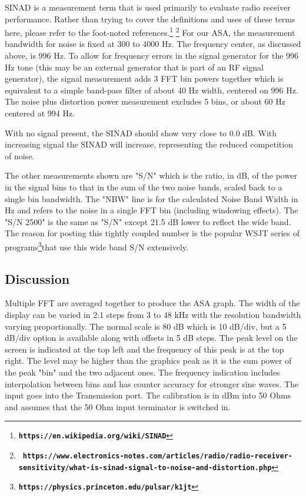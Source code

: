 SINAD is a measurement term that is used primarily to evaluate radio receiver performance.  Rather than trying to cover the definitions and uses of these terms here, please refer to the foot-noted references.\footnote{\textbf{\texttt{https://en.wikipedia.org/wiki/SINAD}}} \footnote{{\tiny\ \textbf{\texttt{https://www.electronics-notes.com/articles/radio/radio-receiver-sensitivity/what-is-sinad-signal-to-noise-and-distortion.php}}}}
%
For our ASA, the measurement bandwidth for noise is fixed at 300 to 4000 Hz.  The frequency center, as discussed above, is 996 Hz.  To allow for frequency errors in the signal generator for the 996 Hz tone (this may be an external generator that is part of an RF signal generator), the signal measurement adds 3 FFT bin powers together which is equivalent to a simple band-pass filter of about 40 Hz width, centered on 996 Hz.  The noise plus distortion power measurement excludes 5 bins, or about 60 Hz centered at 994 Hz.

With no signal present, the SINAD should show very close to 0.0 dB.  With increasing signal the SINAD will increase, representing the reduced competition of noise.

The other measurements shown are "\textsf{S/N}" which is the ratio, in dB, of the power in the signal bins to that in the sum of the two noise bands, scaled back to a single bin bandwidth.   The "\textsf{NBW}"  line is for the calculated Noise Band Width in Hz and refers to the noise in a single FFT bin (including windowing effects).   The "\textsf{S/N 2500}" is the same as "\textsf{S/N}" except 21.5 dB lower to reflect the wide band.  The reason for posting this tightly coupled number is the popular WSJT series of programs\footnote{\textbf{\texttt{https://physics.princeton.edu/pulsar/k1jt}}}that use this wide band S/N extensively.

\subsection{Discussion}
\label{subsect:ASADiscus}
Multiple FFT are averaged together to produce the ASA graph.  The width of the display can be varied in 2:1 steps from 3 to 48 kHz with the resolution bandwidth varying proportionally.  The normal scale is 80 dB which is 10 dB/div, but a 5 dB/div option is available along with offsets in 5 dB steps.  The peak level on the screen is indicated at the top left and the frequency of this peak is at the top right.  The level may be higher than the graphics peak as it is the sum power of the peak "bin" and the two adjacent ones.  The frequency indication includes interpolation between bins and has counter accuracy for stronger sine waves.  The input goes into the  Transmission port.  The calibration is in dBm into 50 Ohms and assumes that the 50 Ohm input terminator is switched in.
